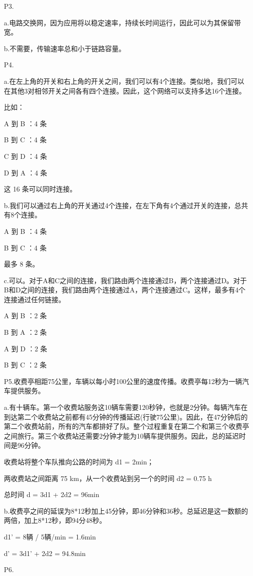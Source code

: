 \documentclass[11pt,UTF8,twoside]{article}
\begin{document}
	P3.
	
	a.电路交换网，因为应用将以稳定速率，持续长时间运行，因此可以为其保留带宽。
	
	b.不需要，传输速率总和小于链路容量。
	
	P4.
	
	a.在左上角的开关和右上角的开关之间，我们可以有4个连接。类似地，我们可以在其他3对相邻开关之间各有四个连接。因此，这个网络可以支持多达16个连接。
	
	比如：
	
	A 到 B ：4 条
	
	B 到 C ：4 条
	
	C 到 D ：4 条
	
	D 到 A ：4 条
	
	这 16 条可以同时连接。
	
	b.我们可以通过右上角的开关通过4个连接，在左下角有4个通过开关的连接，总共有8个连接。
	
	A 到 B ：4 条
	
	B 到 C ：4 条
	
	最多 8 条。
	
	c.可以。对于A和C之间的连接，我们路由两个连接通过B，两个连接通过D。对于B和D之间的连接，我们路由两个连接通过A，两个连接通过C。这样，最多有4个连接通过任何链接。
	
	A 到 B ：2 条
	
	B 到 A ：2 条
	
	A 到 D ：2 条
	
	B 到 C ：2 条
	
	P5.收费亭相距75公里，车辆以每小时100公里的速度传播。收费亭每12秒为一辆汽车提供服务。
	
	a.有十辆车。第一个收费站服务这10辆车需要120秒钟，也就是2分钟。每辆汽车在到达第二个收费站之前都有45分钟的传播延迟(行驶75公里)。因此，在47分钟后的第二个收费站前，所有的汽车都排好了队。整个过程重复在第二个和第三个收费亭之间旅行。第三个收费站还需要2分钟才能为10辆车提供服务。因此，总的延迟时间是96分钟。
	
	收费站将整个车队推向公路的时间为 d1 = 2min；
	
	两收费站之间距离 75 km，从一个收费站到另一个的时间 d2 = 0.75 h
	
	总时间 d = 3d1 + 2d2 = 96min
	
	b.收费亭之间的延误为8*12秒加上45分钟，即46分钟和36秒。总延迟是这一数额的两倍，加上8*12秒，即94分48秒。
	
	d1’ = 8辆 / 5辆/min = 1.6min
	
	d’ = 3d1’ + 2d2 = 94.8min
	
	P6.
	
\end{document}
